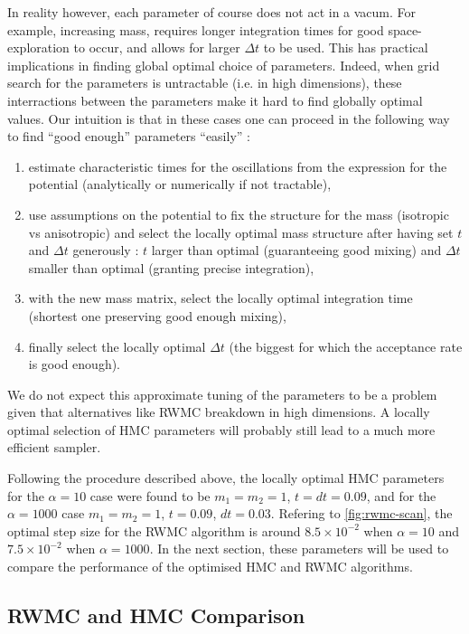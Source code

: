 \documentclass[a4paper, 12pt,oneside]{article}
\begin{document}
			In reality however, each parameter of course does not act in a vacum. For example, increasing mass, requires longer integration times for good space-exploration to occur, and allows for larger $\Delta t$ to be used. This has practical implications in finding global optimal choice of parameters. Indeed, when grid search for the parameters is untractable (i.e. in high dimensions), these interractions between the parameters make it hard to find globally optimal values. Our intuition is that in these cases one can proceed in the following way to find ``good enough'' parameters ``easily'' : 
			\begin{enumerate}
				\item estimate characteristic times for the oscillations from the expression for the potential (analytically or  numerically if not tractable),
				\item use assumptions on the potential to fix the structure for the mass (isotropic vs anisotropic) and select the locally optimal mass structure after having set $t$ and $\Delta t$ generously : $t$ larger than optimal (guaranteeing good mixing) and $\Delta t$ smaller than optimal (granting precise integration),
				\item with the new mass matrix, select the locally optimal integration time (shortest one preserving good enough mixing),
				\item finally select the locally optimal $\Delta t$ (the biggest for which the acceptance rate is good enough).
			\end{enumerate}
			We do not expect this approximate tuning of the parameters to be a problem given that alternatives like RWMC breakdown in high dimensions. A locally optimal selection of HMC parameters will probably still lead to a much more efficient sampler.

			Following the procedure described above, the locally optimal  HMC parameters for the $\alpha=10$ case were found to be $m_1=m_2=1$, $t=dt=0.09$, and for the $\alpha=1000$ case $m_1=m_2=1$, $t=0.09$, $dt=0.03$. Refering to \ref{fig:rwmc-scan}, the optimal step size for the RWMC algorithm is around $8.5\times 10^{-2}$ when $\alpha=10$ and $7.5\times 10^{-2}$ when $\alpha=1000$. In the next section, these parameters will be used to compare the performance of the optimised HMC and RWMC algorithms.
		\subsection{RWMC and HMC Comparison}
\end{document}
